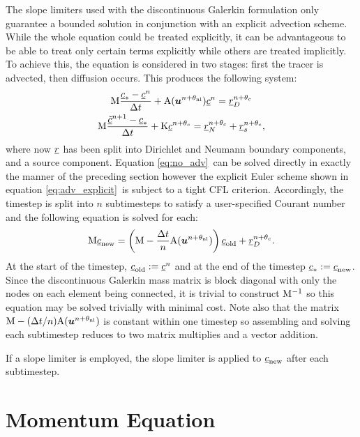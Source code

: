 The slope limiters used with the discontinuous Galerkin formulation only
guarantee a bounded solution in conjunction with an explicit advection
scheme. While the whole equation could be treated explicitly, it can be advantageous
to be able to treat only certain terms explicitly while others are treated implicitly.
To achieve this, the equation is considered in two stages: first the
tracer is advected, then diffusion occurs. This produces the following
system:
\begin{gather}
  \mathrm{M} \frac{\underline{c}_*-\underline{c}^{n}}{\Delta t}
  +\mathrm{A}({\mbox{\boldmath$u$}}^{n+\theta_{\mathrm{nl}}})\underline{c}^{n}=\underline{r}_D^{n+\theta_c}\label{eq:adv_explicit}\\
  \mathrm{M} \frac{\underline{\tilde c}^{n+1}-\underline{c}_*}{\Delta t}
  +\mathrm{K}\underline{c}^{n+\theta_c}=\underline{r}_N^{n+\theta_c}+\underline{r}_s^{n+\theta_c}\label{eq:no_adv},
\end{gather}
where now $\underline{r}$ has been split into Dirichlet and Neumann boundary
components, and a source component. Equation \eqref{eq:no_adv}\ can be
solved directly in exactly the manner of the preceding section however the
explicit Euler scheme shown in equation \eqref{eq:adv_explicit}\ is subject
to a tight CFL criterion. Accordingly, the timestep is split into $n$
subtimesteps to satisfy a user-specified Courant number and the following
equation is solved for each:
\begin{equation}
  \mathrm{M} \underline{c}_{\mathrm{new}}=\left(\mathrm{M}-\frac{\Delta t}{n}\mathrm{A}({\mbox{\boldmath$u$}}^{n+\theta_{\mathrm{nl}}})\right) \underline{c}_{\mathrm{old}}+\underline{r}_D^{n+\theta_c}.
\end{equation}
At the start of the timestep, $\underline{c}_{\mathrm{old}}:=\underline{c}^{n}$ and at the
end of the timestep $\underline{c}_*:=\underline{c}_{\mathrm{new}}$.
Since the discontinuous Galerkin mass matrix is block diagonal with only the
nodes on each element being connected, it is trivial to construct
$\mathrm{M}^{-1}$ so this equation may be solved trivially with minimal cost. Note also that the
matrix $\mathrm{M}-(\Delta t/n)\mathrm{A}({\mbox{\boldmath$u$}}^{n+\theta_{\mathrm{nl}}})$ is constant within one timestep
so assembling and solving each subtimestep reduces to two matrix
multiplies and a vector addition.

If a slope limiter is employed, the slope limiter is applied to
$\underline{c}_{\mathrm{new}}$ after each subtimestep.

\section{Momentum Equation}

